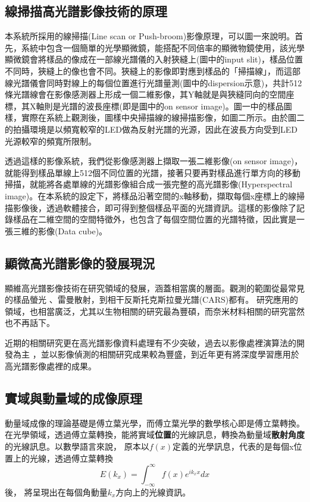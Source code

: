 \documentclass[12pt]{article}
\begin{document}
    \subsection{線掃描高光譜影像技術的原理}
    本系統所採用的線掃描(Line scan or Push-broom)影像原理，可以圖一來說明。首先，系統中包含一個簡單的光學顯微鏡，能搭配不同倍率的顯微物鏡使用，該光學顯微鏡會將樣品的像成在一部線光譜儀的入射狹縫上(圖中的input slit)，樣品位置不同時，狹縫上的像也會不同。狹縫上的影像即對應到樣品的「掃描線」，而這部線光譜儀會同時對線上的每個位置進行光譜量測(圖中的dispersion示意)，共計512條光譜線會在影像感測器上形成一個二維影像，其Y軸就是與狹縫同向的空間座標，其X軸則是光譜的波長座標(即是圖中的on sensor image)。圖一中的樣品圖樣，實際在系統上觀測後，圖樣中央掃描線的線掃描影像，如圖二所示。由於圖二的拍攝環境是以頻寬較窄的LED做為反射光譜的光源，因此在波長方向受到LED光源較窄的頻寬所限制。

透過這樣的影像系統，我們從影像感測器上擷取一張二維影像(on sensor image)，就能得到樣品單線上512個不同位置的光譜，接著只要再對樣品進行單方向的移動掃描，就能將各處單線的光譜影像組合成一張完整的高光譜影像(Hyperspectral image)。在本系統的設定下，將樣品沿著空間的x軸移動，擷取每個x座標上的線掃描影像後，透過軟體接合，即可得到整個樣品平面的光譜資訊。這樣的影像除了記錄樣品在二維空間的空間特徵外，也包含了每個空間位置的光譜特徵，因此實是一張三維的影像(Data cube)。

    \subsection{顯微高光譜影像的發展現況}
顯維高光譜影像技術在研究領域的發展，涵蓋相當廣的層面。觀測的範圍從最常見的樣品螢光
、雷曼散射，到相干反斯托克斯拉曼光譜(CARS)都有\cite{roth2015hyperspectral,zhang2013quantitative, pegoraro2014hyperspectral}。
研究應用的領域，也相當廣泛，尤其以生物相關的研究最為豐碩\cite{leavesley2012hyperspectral,studer2012compressive}，而奈米材料相關的研究當然也不再話下\cite{roth2015hyperspectral}。

近期的相關研究更在高光譜影像資料處理有不少突破，過去以影像處裡演算法的開發為主
\cite{manolakis2002detection,nascimento2005vertex}
，並以影像偵測的相關研究成果較為豐盛\cite{manolakis2009there}，到近年更有將深度學習應用於高光譜影像處裡的成果\cite{chen2014deep}。
\subsection{實域與動量域的成像原理}
動量域成像的理論基礎是傅立葉光學，而傅立葉光學的數學核心即是傅立葉轉換。在光學領域，透過傅立葉轉換，能將實域\textbf{位置}的光線訊息，轉換為動量域\textbf{散射角度}的光線訊息。以數學語言來說，
原本以\(f(x)\)定義的光學訊息，代表的是每個x位置上的光線，透過傅立葉轉換\[E(k_x)=\int_{-\infty}^{\infty}f(x)e^{ik_xx}dx\]後，
將呈現出在每個角動量\(k_x\)方向上的光線資訊。
\end{document}
